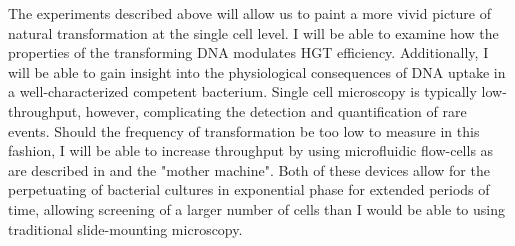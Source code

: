 The experiments described above will allow us to paint a more vivid picture of
natural transformation at the single cell level. I will be able to examine how
the properties of the transforming DNA modulates HGT efficiency. Additionally, I
will be able to gain insight into the physiological consequences of DNA uptake
in a well-characterized competent bacterium. Single cell microscopy is typically
low-throughput, however, complicating the detection and quantification of rare
events. Should the frequency of transformation be too low to measure in this
fashion, I will be able to increase throughput by using microfluidic flow-cells
as are described in \cite{Lambert:2015bk, Lambert:2014gc} and the
\citet{Wang:2010jz} "mother machine". Both of these devices allow for the perpetuating of
bacterial cultures in exponential phase for extended periods of time, allowing
screening of a larger number of cells than I would be able to using traditional
slide-mounting microscopy.






